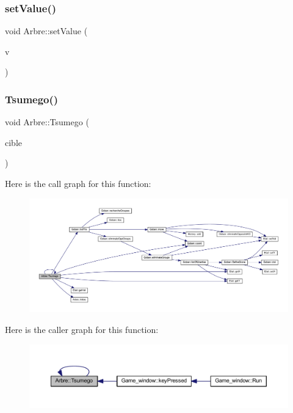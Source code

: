 \mbox{\label{class_arbre_a8108ffdff578e323dd9e50cc105a5c04}} 
\subsubsection{\texorpdfstring{set\+Value()}{setValue()}}
{\footnotesize\ttfamily void Arbre\+::set\+Value (\begin{DoxyParamCaption}\item[{\hyperlink{class_etat_af3ddb2296ffc379b7f3ad2bf832f294e}{Etat\+::\+V\+AL}}]{v }\end{DoxyParamCaption})}

\mbox{\label{class_arbre_acd12cae4820bb7780a628716a0615d10}} 
\subsubsection{\texorpdfstring{Tsumego()}{Tsumego()}}
{\footnotesize\ttfamily void Arbre\+::\+Tsumego (\begin{DoxyParamCaption}\item[{\hyperlink{class_etat}{Etat} \&}]{cible }\end{DoxyParamCaption})}

Here is the call graph for this function\+:\nopagebreak
\begin{figure}[H]
\begin{center}
\leavevmode
\includegraphics[width=350pt]{class_arbre_acd12cae4820bb7780a628716a0615d10_cgraph}
\end{center}
\end{figure}
Here is the caller graph for this function\+:\nopagebreak
\begin{figure}[H]
\begin{center}
\leavevmode
\includegraphics[width=350pt]{class_arbre_acd12cae4820bb7780a628716a0615d10_icgraph}
\end{center}
\end{figure}


